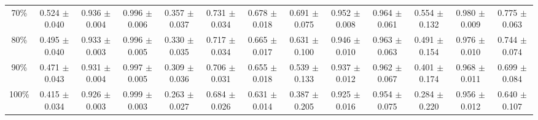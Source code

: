 \documentclass[11pt]{article}
\begin{document}
\begin{table}[ht]
{\begin{tabular}{ccccccccccccc}
70\% & 0.524 $\pm$ 0.040 & 0.936 $\pm$ 0.004 & 0.996 $\pm$ 0.006 & 0.357 $\pm$ 0.037 & 0.731 $\pm$ 0.034 & 0.678 $\pm$ 0.018 & 0.691 $\pm$ 0.075 & 0.952 $\pm$ 0.008 & 0.964 $\pm$ 0.061 & 0.554 $\pm$ 0.132 & 0.980 $\pm$ 0.009 & 0.775 $\pm$ 0.063 \\
80\% & 0.495 $\pm$ 0.040 & 0.933 $\pm$ 0.003 & 0.996 $\pm$ 0.005 & 0.330 $\pm$ 0.035 & 0.717 $\pm$ 0.034 & 0.665 $\pm$ 0.017 & 0.631 $\pm$ 0.100 & 0.946 $\pm$ 0.010 & 0.963 $\pm$ 0.063 & 0.491 $\pm$ 0.154 & 0.976 $\pm$ 0.010 & 0.744 $\pm$ 0.074 \\
90\% & 0.471 $\pm$ 0.043 & 0.931 $\pm$ 0.004 & 0.997 $\pm$ 0.005 & 0.309 $\pm$ 0.036 & 0.706 $\pm$ 0.031 & 0.655 $\pm$ 0.018 & 0.539 $\pm$ 0.133 & 0.937 $\pm$ 0.012 & 0.962 $\pm$ 0.067 & 0.401 $\pm$ 0.174 & 0.968 $\pm$ 0.011 & 0.699 $\pm$ 0.084 \\
100\% & 0.415 $\pm$ 0.034 & 0.926 $\pm$ 0.003 & 0.999 $\pm$ 0.003 & 0.263 $\pm$ 0.027 & 0.684 $\pm$ 0.026 & 0.631 $\pm$ 0.014 & 0.387 $\pm$ 0.205 & 0.925 $\pm$ 0.016 & 0.954 $\pm$ 0.075 & 0.284 $\pm$ 0.220 & 0.956 $\pm$ 0.012 & 0.640 $\pm$ 0.107 \\
\bottomrule
\end{tabular}
}
\end{table}

\clearpage
\end{document}
